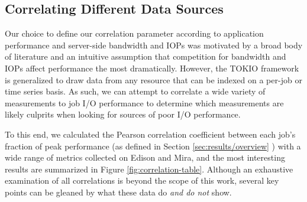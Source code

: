 
\subsection{Correlating Different Data Sources} \label{sec:results/correlating}


Our choice to define our correlation parameter according to application performance and server-side bandwidth and IOPs was motivated by a broad body of literature and an intuitive assumption that competition for bandwidth and IOPs affect performance the most dramatically.
However, the TOKIO framework is generalized to draw data from any resource that can be indexed on a per-job or time series basis.
As such, we can attempt to correlate a wide variety of measurements to job I/O performance to determine which measurements are likely culprits when looking for sources of poor I/O performance.

To this end, we calculated the Pearson correlation coefficient between each job's fraction of peak performance (as defined in Section \ref{sec:results/overview} ) with a wide range of metrics collected on Edison and Mira, and the most interesting results are summarized in Figure \ref{fig:correlation-table}.
Although an exhaustive examination of all correlations is beyond the scope of this work, several key points can be gleaned by what these data do \emph{and do not} show.

